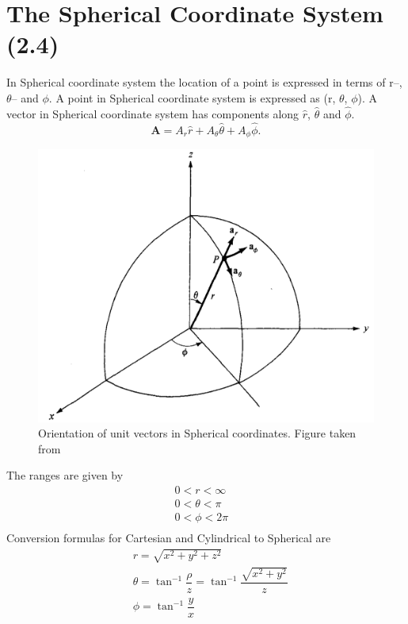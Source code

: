 \documentclass[12pt,a4paper]{article}
\begin{document}
\section{The Spherical Coordinate System (2.4)}
In Spherical coordinate system the location of a point is expressed in terms of r--, $\theta$-- and $\phi$. A point in Spherical coordinate system is expressed as (r, $\theta$, $\phi$). A vector in Spherical coordinate system has components along $\hat r$, $\hat \theta$ and $\hat \phi$.
\begin{equation}
\textbf{A}=A_r\hat r+A_\theta\hat \theta+ A_\phi\hat \phi.
\end{equation}
\begin{figure}[htb]
\centering
\includegraphics[scale=0.45]{Figure2-4S.png}
\caption{Orientation of unit vectors in Spherical coordinates. Figure taken from~\cite[Figure 2.4, page 33]{Sadiku}}
\label{Unit-vectors-spherical-coordinates}
\end{figure}
The ranges are given by
\begin{equation*}
\begin{split}
0 < r < \infty&\\
0 < \theta < \pi&\\
0 < \phi < 2\pi&\\
\end{split}
\end{equation*}
Conversion formulas for Cartesian and Cylindrical to Spherical are
\begin{equation}
\begin{split}
&r = \sqrt{x^2+y^2+z^2}\\
&\theta = \tan^{-1}{\dfrac{\rho}{z}}=\tan^{-1}{\dfrac{\sqrt{x^2+y^2}}{z}}\\
&\phi = \tan^{-1}{\dfrac{y}{x}}
\end{split}
\end{equation}
\end{document}
